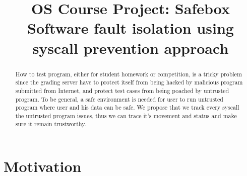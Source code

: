 \documentclass[conference,compsoc]{IEEEtran}
\begin{document}
\title{
	OS Course Project: Safebox\\ 
	Software fault isolation using syscall prevention approach
}


\author{
\and
}

\maketitle

\begin{abstract}
	How to test program, either for student homework or competition, is a tricky problem since the grading server have to protect itself from being hacked by malicious program submitted from Internet, and protect test cases from being poached by untrusted program. 
	To be general, a safe environment is needed for user to run untrusted program where user and his data can be safe. 
	We propose that we track every syscall the untrusted program issues, thus we can trace it's movement and status and make sure it remain trustworthy. 
\end{abstract}

\section{Motivation}
\end{document}
